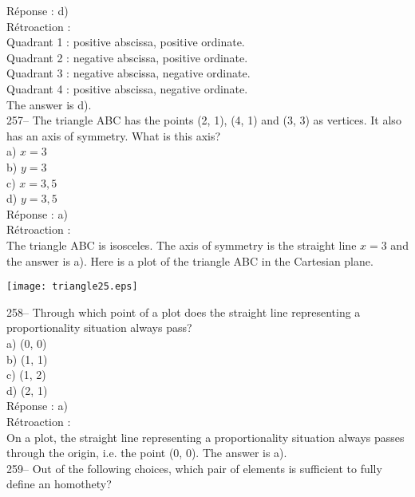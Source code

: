 \documentclass[letterpaper, 12pt]{article}
\begin{document}
R\'eponse : d)\\

R\'etroaction : \\
Quadrant 1 : positive abscissa, positive ordinate.\\
Quadrant 2 : negative abscissa, positive ordinate.\\
Quadrant 3 : negative abscissa, negative ordinate.\\
Quadrant 4 : positive abscissa, negative ordinate.\\

The answer is d).\\

257-- The triangle ABC has the points (2, 1), (4, 1) and
(3, 3) as vertices. It also has an axis of symmetry. What is this axis?\\

a) $x=3$\\
b) $y=3$\\
c) $x=3,5$\\
d) $y=3,5$\\

R\'eponse : a)\\

R\'etroaction : \\
The triangle ABC is isosceles. The axis of symmetry is the straight
line $x=3$ and the answer is a). Here is a plot of the triangle ABC
in the Cartesian plane.\\
    \begin{center}
    \texttt{[image: triangle25.eps]}
    \end{center}


258-- Through which point of a plot does the straight line
representing a proportionality situation always pass?\\

a) (0, 0)\\
b) (1, 1)\\
c) (1, 2)\\
d) (2, 1)\\

R\'eponse : a)\\

R\'etroaction :\\
On a plot, the straight line representing a proportionality
situation always passes through the origin, i.e. the point (0, 0).
The answer is a).\\

259-- Out of the following choices, which pair of elements is
sufficient to fully define an homothety?\\
\end{document}
